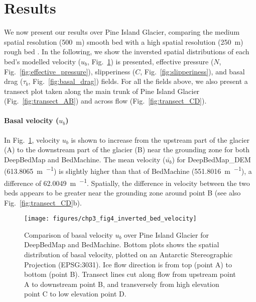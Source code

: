 \clearpage
\section{Results} \label{sec:results}

We now present our results over Pine Island Glacier, comparing the medium spatial resolution (\SI{500}{\metre}) smooth bed \citep[BedMachine v2;][]{MorlighemMEaSUREsBedMachineAntarctica2020} with a high spatial resolution (\SI{250}{\metre}) rough bed \citep[DeepBedMap\_DEM v1.1;][]{LeongDeepBedMap2020}.
In the following, we show the inversted spatial distributions of each bed's modelled velocity ($u_b$, Fig.~\ref{fig:velocity}) is presented, effective pressure ($N$, Fig.~\ref{fig:effective_pressure}), slipperiness ($C$, Fig.~\ref{fig:slipperiness}), and basal drag ($\tau_b$, Fig.~\ref{fig:basal_drag}) fields.
For all the fields above, we also present a transect plot taken along the main trunk of Pine Island Glacier (Fig.~\ref{fig:transect_AB}) and across flow (Fig.~\ref{fig:transect_CD}).

\paragraph{Basal velocity ($u_b$)}

In Fig.~\ref{fig:velocity}, velocity $u_b$ is shown to increase from the upstream part of the glacier (A) to the downstream part of the glacier (B) near the grounding zone for both DeepBedMap and BedMachine.
The mean velocity ($\bar{u_b}$) for DeepBedMap\_DEM (\SI{613.8065}{\metre\per\year}) is slightly higher than that of BedMachine (\SI{551.8016}{\metre\per\year}), a difference of \SI{62.0049}{\metre\per\year}.
Spatially, the difference in velocity between the two beds appears to be greater near the grounding zone around point B (see also Fig.~\ref{fig:transect_CD}b).

\begin{figure}[htbp]
  \texttt{[image: figures/chp3\_fig4\_inverted\_bed\_velocity]}
  \caption[Comparison of basal velocity over Pine Island Glacier for DeepBedMap and BedMachine]{
    Comparison of basal velocity $u_b$ over Pine Island Glacier for DeepBedMap and BedMachine.
    Bottom plots shows the spatial distribution of basal velocity, plotted on an Antarctic Stereographic Projection (EPSG:3031).
    Ice flow direction is from top (point A) to bottom (point B).
    Transect lines cut along flow from upstream point A to downstream point B, and transversely from high elevation point C to low elevation point D.
  }
  \label{fig:velocity}
\end{figure}

